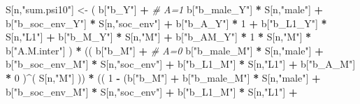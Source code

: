 \documentclass[
]{book}
\newenvironment{Shaded}{\begin{snugshade}}{\end{snugshade}}
\newcommand{\CommentTok}[1]{\textcolor[rgb]{0.56,0.35,0.01}{\textit{#1}}}
\newcommand{\DecValTok}[1]{\textcolor[rgb]{0.00,0.00,0.81}{#1}}
\newcommand{\NormalTok}[1]{#1}
\newcommand{\OtherTok}[1]{\textcolor[rgb]{0.56,0.35,0.01}{#1}}
\newcommand{\SpecialCharTok}[1]{\textcolor[rgb]{0.81,0.36,0.00}{\textbf{#1}}}
\newcommand{\StringTok}[1]{\textcolor[rgb]{0.31,0.60,0.02}{#1}}
\begin{document}
\begin{Shaded}
\begin{Highlighting}[]
\NormalTok{    S[n,}\StringTok{"sum.psi10"}\NormalTok{] }\OtherTok{\textless{}{-}}\NormalTok{  ( b[}\StringTok{"b\_Y"}\NormalTok{] }\SpecialCharTok{+}                                           \CommentTok{\# A=1}
\NormalTok{                             b[}\StringTok{"b\_male\_Y"}\NormalTok{] }\SpecialCharTok{*}\NormalTok{ S[n,}\StringTok{"male"}\NormalTok{] }\SpecialCharTok{+} 
\NormalTok{                             b[}\StringTok{"b\_soc\_env\_Y"}\NormalTok{] }\SpecialCharTok{*}\NormalTok{ S[n,}\StringTok{"soc\_env"}\NormalTok{] }\SpecialCharTok{+} 
\NormalTok{                             b[}\StringTok{"b\_A\_Y"}\NormalTok{] }\SpecialCharTok{*} \DecValTok{1} \SpecialCharTok{+} 
\NormalTok{                             b[}\StringTok{"b\_L1\_Y"}\NormalTok{] }\SpecialCharTok{*}\NormalTok{ S[n,}\StringTok{"L1"}\NormalTok{] }\SpecialCharTok{+}
\NormalTok{                             b[}\StringTok{"b\_M\_Y"}\NormalTok{] }\SpecialCharTok{*}\NormalTok{ S[n,}\StringTok{"M"}\NormalTok{] }\SpecialCharTok{+}
\NormalTok{                             b[}\StringTok{"b\_AM\_Y"}\NormalTok{] }\SpecialCharTok{*} \DecValTok{1} \SpecialCharTok{*}\NormalTok{ S[n,}\StringTok{"M"}\NormalTok{] }\SpecialCharTok{*}\NormalTok{ b[}\StringTok{"A.M.inter"}\NormalTok{] ) }\SpecialCharTok{*}
\NormalTok{      (( b[}\StringTok{"b\_M"}\NormalTok{] }\SpecialCharTok{+}                                                             \CommentTok{\# A\textquotesingle{}=0}
\NormalTok{           b[}\StringTok{"b\_male\_M"}\NormalTok{] }\SpecialCharTok{*}\NormalTok{ S[n,}\StringTok{"male"}\NormalTok{] }\SpecialCharTok{+} 
\NormalTok{           b[}\StringTok{"b\_soc\_env\_M"}\NormalTok{] }\SpecialCharTok{*}\NormalTok{ S[n,}\StringTok{"soc\_env"}\NormalTok{] }\SpecialCharTok{+} 
\NormalTok{           b[}\StringTok{"b\_L1\_M"}\NormalTok{] }\SpecialCharTok{*}\NormalTok{ S[n,}\StringTok{"L1"}\NormalTok{] }\SpecialCharTok{+}
\NormalTok{           b[}\StringTok{"b\_A\_M"}\NormalTok{] }\SpecialCharTok{*} \DecValTok{0}\NormalTok{ )}\SpecialCharTok{\^{}}\NormalTok{( S[n,}\StringTok{"M"}\NormalTok{] )) }\SpecialCharTok{*}
\NormalTok{      (( }\DecValTok{1} \SpecialCharTok{{-}}\NormalTok{ (b[}\StringTok{"b\_M"}\NormalTok{] }\SpecialCharTok{+} 
\NormalTok{                b[}\StringTok{"b\_male\_M"}\NormalTok{] }\SpecialCharTok{*}\NormalTok{ S[n,}\StringTok{"male"}\NormalTok{] }\SpecialCharTok{+} 
\NormalTok{                b[}\StringTok{"b\_soc\_env\_M"}\NormalTok{] }\SpecialCharTok{*}\NormalTok{ S[n,}\StringTok{"soc\_env"}\NormalTok{] }\SpecialCharTok{+} 
\NormalTok{                b[}\StringTok{"b\_L1\_M"}\NormalTok{] }\SpecialCharTok{*}\NormalTok{ S[n,}\StringTok{"L1"}\NormalTok{] }\SpecialCharTok{+}

\end{Highlighting}
\end{Shaded}
\end{document}
